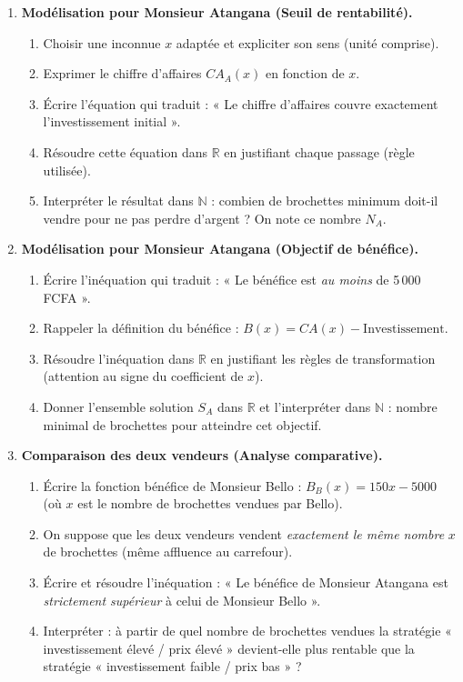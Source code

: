 \documentclass[11pt]{article}
\begin{document}
\begin{enumerate}
    \item \textbf{Modélisation pour Monsieur Atangana (Seuil de rentabilité).}
    \begin{enumerate}
        \item Choisir une inconnue $x$ adaptée et expliciter son sens (unité comprise).
        \item Exprimer le chiffre d'affaires $CA_A(x)$ en fonction de $x$.
        \item Écrire l'équation qui traduit : « Le chiffre d'affaires couvre exactement l'investissement initial ».
        \item Résoudre cette équation dans $\mathbb{R}$ en justifiant chaque passage (règle utilisée).
        \item Interpréter le résultat dans $\mathbb{N}$ : combien de brochettes minimum doit-il vendre pour ne pas perdre d'argent ? On note ce nombre $N_A$.
    \end{enumerate}

    \item \textbf{Modélisation pour Monsieur Atangana (Objectif de bénéfice).}
    \begin{enumerate}
        \item Écrire l'inéquation qui traduit : « Le bénéfice est \emph{au moins} de 5\,000 FCFA ».
        \item Rappeler la définition du bénéfice : $B(x) = CA(x) - \text{Investissement}$.
        \item Résoudre l'inéquation dans $\mathbb{R}$ en justifiant les règles de transformation (attention au signe du coefficient de $x$).
        \item Donner l'ensemble solution $S_A$ dans $\mathbb{R}$ et l'interpréter dans $\mathbb{N}$ : nombre minimal de brochettes pour atteindre cet objectif.
    \end{enumerate}

    \item \textbf{Comparaison des deux vendeurs (Analyse comparative).}
    \begin{enumerate}
        \item Écrire la fonction bénéfice de Monsieur Bello : $B_B(x) = 150x - 5000$ (où $x$ est le nombre de brochettes vendues par Bello).
        \item On suppose que les deux vendeurs vendent \emph{exactement le même nombre} $x$ de brochettes (même affluence au carrefour).
        \item Écrire et résoudre l'inéquation : « Le bénéfice de Monsieur Atangana est \emph{strictement supérieur} à celui de Monsieur Bello ».
        \item Interpréter : à partir de quel nombre de brochettes vendues la stratégie « investissement élevé / prix élevé » devient-elle plus rentable que la stratégie « investissement faible / prix bas » ?
    \end{enumerate}


\end{enumerate}
\end{document}
